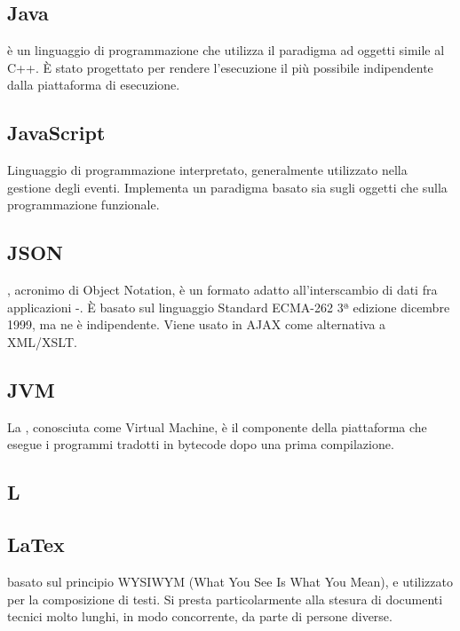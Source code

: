 \subsection*{Java}
 è un linguaggio di programmazione che utilizza il paradigma ad oggetti simile al C++. È stato
progettato per rendere l'esecuzione il più possibile indipendente dalla piattaforma di
esecuzione.

\subsection*{JavaScript}
Linguaggio di programmazione interpretato, generalmente utilizzato nella gestione
degli eventi. Implementa un paradigma basato sia sugli oggetti che sulla programmazione
funzionale.

\subsection*{JSON}
, acronimo di  Object Notation, è un formato adatto all'interscambio di dati fra applicazioni -. È basato sul linguaggio  Standard ECMA-262 3ª edizione dicembre 1999, ma ne è indipendente. Viene usato in AJAX come alternativa a XML/XSLT.

\subsection*{JVM}
La , conosciuta come  Virtual Machine, è il componente della piattaforma  che esegue i programmi tradotti in bytecode dopo una prima compilazione.

\newpage

\begin{center}
\Huge\section*{\uppercase{L}}
\end{center}

\subsection*{LaTex}
 basato sul principio WYSIWYM (What You See Is What You
Mean), e utilizzato per la composizione di testi. Si presta particolarmente alla stesura di
documenti tecnici molto lunghi, in modo concorrente, da parte di persone diverse.


